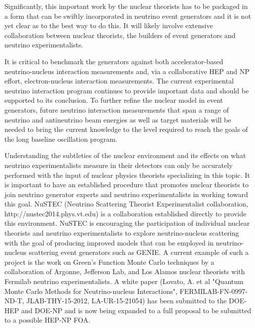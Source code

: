 Significantly, this important work by the nuclear theorists has to be
packaged in a form that can be swiftly incorporated in neutrino event
generators and it is not yet clear as to the best way to do this. It
will likely involve extensive collaboration between nuclear theorists,
the builders of event generators and neutrino experimentalists.

It is critical to benchmark the generators against both
accelerator-based neutrino-nucleus interaction measurements and, via a
collaborative HEP and NP effort, electron-nucleus interaction
measurements.  The current experimental neutrino interaction program
continues to provide important data and should be supported to its
conclusion.  To further refine the nuclear model in event generators,
future neutrino interaction measurements that span a range of neutrino
and antineutrino beam energies as well as target materials will be
needed to bring the current knowledge to the level required to reach
the goals of the long baseline oscillation program.

Understanding the subtleties of the nuclear environment and its
effects on what neutrino experimentalists measure in their detectors
can only be accurately performed with the input of nuclear physics
theorists specializing in this topic. It is important to have an
established procedure that promotes nuclear theorists to join neutrino
generator experts and neutrino experimentalists in working toward this
goal. NuSTEC (Neutrino Scattering Theorist Experimentalist
collaboration, http://nustec2014.phys.vt.edu) is a collaboration
established directly to provide this environment.  NuSTEC is
encouraging the participation of individual nuclear theorists and
neutrino experimentalists to explore neutrino-nucleus scattering with
the goal of producing improved models that can be employed in
neutrino-nucleus scattering event generators such as GENIE.  A current
example of such a project is the work on Green's Function Monte Carlo
techniques by a collaboration of Argonne, Jefferson Lab, and Los
Alamos nuclear theorists with Fermilab neutrino experimentalists.  A
white paper (Lovato, A. et al "Quantum Monte Carlo Methods for
Neutrino-nucleus Interactions", FERMILAB-FN-0997-ND-T,
JLAB-THY-15-2012, LA-UR-15-21054) has been submitted to the DOE-HEP
and DOE-NP and is now being expanded to a full proposal to be
submitted to a possible HEP-NP FOA.

